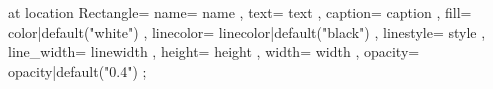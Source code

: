 \pic[shift={ {{- offset -}} }] at {{ location }} {
    Rectangle={
        name={{ name }},
        text={{ text }},
        caption={{ caption }},
        fill={{ color|default("white") }},
        linecolor={{ linecolor|default("black") }},
        linestyle={{ style }},
        line_width={{ linewidth }},
        height={{ height }},
        width={{ width }},
        opacity={{ opacity|default("0.4") }}
    }
};
